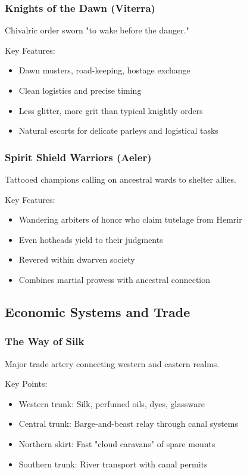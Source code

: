 \subsubsection{Knights of the Dawn (Viterra)}
\label{sec:dawnknights}

Chivalric order sworn "to wake before the danger."

Key Features:
\begin{itemize}
    \item Dawn musters, road-keeping, hostage exchange
    \item Clean logistics and precise timing
    \item Less glitter, more grit than typical knightly orders
    \item Natural escorts for delicate parleys and logistical tasks
\end{itemize}

\subsubsection{Spirit Shield Warriors (Aeler)}
\label{sec:spiritshields}

Tattooed champions calling on ancestral wards to shelter allies.

Key Features:
\begin{itemize}
    \item Wandering arbiters of honor who claim tutelage from Hemrir
    \item Even hotheads yield to their judgments
    \item Revered within dwarven society
    \item Combines martial prowess with ancestral connection
\end{itemize}

\subsection{Economic Systems and Trade}

\subsubsection{The Way of Silk}
\label{sec:wayofsilk}

Major trade artery connecting western and eastern realms.

Key Points:
\begin{itemize}
    \item Western trunk: Silk, perfumed oils, dyes, glassware
    \item Central trunk: Barge-and-beast relay through canal systems
    \item Northern skirt: Fast "cloud caravans" of spare mounts
    \item Southern trunk: River transport with canal permits
\end{itemize}

